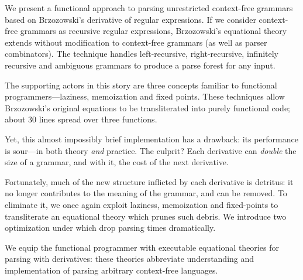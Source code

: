 We present a functional approach to parsing unrestricted context-free grammars
based on Brzozowski's derivative of regular expressions.
%
If we consider context-free grammars as recursive regular expressions,
Brzozowski's equational theory extends without modification to context-free
grammars (as well as parser combinators).
%
The technique handles left-recursive, right-recursive, infinitely
recursive and ambiguous grammars to produce a parse forest for any input.

The supporting actors in this story are three concepts familiar to functional
programmers---laziness, memoization and fixed points.
%
These techniques allow Brzozowski's original equations to be transliterated
into purely functional code; about 30 lines spread over three functions.
 

Yet, this almost impossibly brief implementation has a drawback: its
performance is sour---in both theory \emph{and} practice.
%
The culprit?
%
Each derivative can \emph{double} the size of a grammar, and with it, the cost
of the next derivative.


Fortunately, much of the new structure inflicted by each derivative is
detritus: it no longer contributes to the meaning of the grammar, and can be
removed.
%
To eliminate it, we once again exploit laziness, memoization and fixed-points
to transliterate an equational theory which prunes such debris.
%
We introduce two optimization under which drop parsing times dramatically. 

We equip the functional programmer with executable equational theories for
parsing with derivatives: these theories abbreviate 
understanding and implementation of parsing arbitrary context-free languages.




